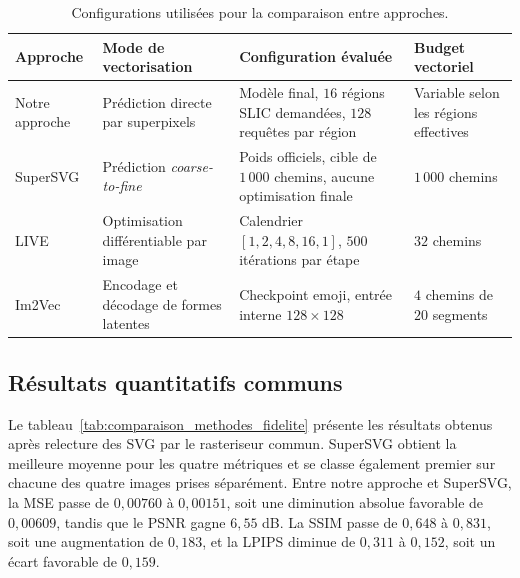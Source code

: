 \documentclass[12pt, a4paper, oneside]{report}
\begin{document}
\begin{table}[H]
    \centering
    \footnotesize
    \caption{Configurations utilisées pour la comparaison entre approches.}
    \label{tab:configurations_methodes_reference}
    \begin{tabular}{p{2.2cm}p{3.4cm}p{4.0cm}p{3.4cm}}
        \toprule
        \textbf{Approche} & \textbf{Mode de vectorisation} & \textbf{Configuration évaluée} & \textbf{Budget vectoriel} \\
        \midrule
        Notre approche & Prédiction directe par superpixels & Modèle final, $16$ régions SLIC demandées, $128$ requêtes par région & Variable selon les régions effectives \\
        SuperSVG & Prédiction \textit{coarse-to-fine} & Poids officiels, cible de $1\,000$ chemins, aucune optimisation finale & $1\,000$ chemins \\
        LIVE & Optimisation différentiable par image & Calendrier $[1,2,4,8,16,1]$, $500$ itérations par étape & $32$ chemins \\
        Im2Vec & Encodage et décodage de formes latentes & Checkpoint emoji, entrée interne $128 \times 128$ & $4$ chemins de $20$ segments \\
        \bottomrule
    \end{tabular}
\end{table}

\subsection{Résultats quantitatifs communs}

Le tableau~\ref{tab:comparaison_methodes_fidelite} présente les résultats obtenus après relecture des SVG par le rasteriseur commun. SuperSVG obtient la meilleure moyenne pour les quatre métriques et se classe également premier sur chacune des quatre images prises séparément. Entre notre approche et SuperSVG, la MSE passe de $0{,}00760$ à $0{,}00151$, soit une diminution absolue favorable de $0{,}00609$, tandis que le PSNR gagne $6{,}55$ dB. La SSIM passe de $0{,}648$ à $0{,}831$, soit une augmentation de $0{,}183$, et la LPIPS diminue de $0{,}311$ à $0{,}152$, soit un écart favorable de $0{,}159$.
\end{document}

